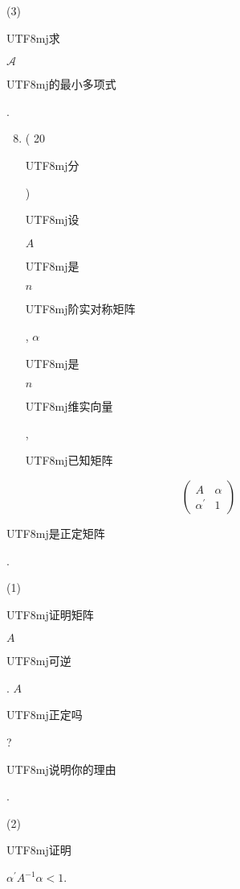 \documentclass[10pt]{article}
\begin{document}
(3) \begin{CJK}{UTF8}{mj}求\end{CJK} $\mathscr{A}$ \begin{CJK}{UTF8}{mj}的最小多项式\end{CJK}.

\begin{enumerate}
  \setcounter{enumi}{7}
  \item ( 20 \begin{CJK}{UTF8}{mj}分\end{CJK}) \begin{CJK}{UTF8}{mj}设\end{CJK} $A$ \begin{CJK}{UTF8}{mj}是\end{CJK} $n$ \begin{CJK}{UTF8}{mj}阶实对称矩阵\end{CJK}, $\alpha$ \begin{CJK}{UTF8}{mj}是\end{CJK} $n$ \begin{CJK}{UTF8}{mj}维实向量\end{CJK}, \begin{CJK}{UTF8}{mj}已知矩阵\end{CJK}
\end{enumerate}
$$
\left(\begin{array}{ll}
A & \alpha \\
\alpha^{\prime} & 1
\end{array}\right)
$$
\begin{CJK}{UTF8}{mj}是正定矩阵\end{CJK}.

(1) \begin{CJK}{UTF8}{mj}证明矩阵\end{CJK} $A$ \begin{CJK}{UTF8}{mj}可逆\end{CJK}. $A$ \begin{CJK}{UTF8}{mj}正定吗\end{CJK}? \begin{CJK}{UTF8}{mj}说明你的理由\end{CJK}.

(2) \begin{CJK}{UTF8}{mj}证明\end{CJK} $\alpha^{\prime} A^{-1} \alpha<1$.
\end{document}
